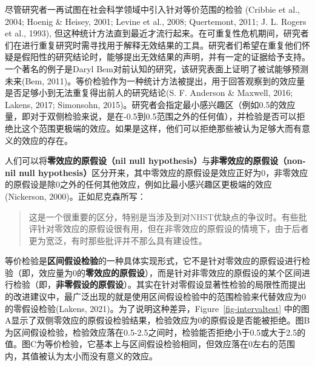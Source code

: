 \documentclass[
  letterpaper,
  DIV=11,
  numbers=noendperiod]{scrreprt}
\begin{document}
尽管研究者一再试图在社会科学领域中引入针对等价范围的检验 (Cribbie et
al., 2004; Hoenig \& Heisey, 2001; Levine et al., 2008; Quertemont,
2011; J. L. Rogers et al., 1993),
但这种统计方法直到最近才流行起来。在可重复性危机期间，研究者们在进行重复研究时需寻找用于解释无效结果的工具。研究者们希望在重复他们怀疑是假阳性的研究结论时，能够提出无效结果的声明，并有一定的证据给予支持。一个著名的例子是Daryl
Bem对前认知的研究，该研究表面上证明了被试能够预测未来(Bem,
2011)。等价检验作为一种统计方法被提出，用于回答观察到的效应量是否足够小到无法重复得出前人的研究结论(S.
F. Anderson \& Maxwell, 2016; Lakens, 2017; Simonsohn,
2015)。研究者会指定最小感兴趣区（例如0.5的效应量，即对于双侧检验来说，是在-0.5到0.5范围之外的任何值），并检验是否可以拒绝比这个范围更极端的效应。如果是这样，他们可以拒绝那些被认为足够大而有意义的效应的存在。

人们可以将\textbf{零效应的原假设（nil null
hypothesis）}与\textbf{非零效应的原假设（non-nil null
hypothesis）}区分开来，其中零效应的原假设是效应正好为0，非零效应的原假设是除0之外的任何其他效应，例如比最小感兴趣区更极端的效应(Nickerson,
2000)。正如尼克森所写：

\begin{quote}
这是一个很重要的区分，特别是当涉及到对NHST优缺点的争议时。有些批评针对零效应的原假设很有用，但在非零效应的原假设的情境下，由于后者更为宽泛，有时那些批评并不那么具有建设性。
\end{quote}

等价检验是\textbf{区间假设检验}的一种具体实现形式，它不是针对零效应的原假设进行检验（即，效应量为0的\textbf{零效应的原假设}），而是针对非零效应的原假设的某个区间进行检验（即，\textbf{非零假设的原假设}）。其实在针对零假设显著性检验的局限性而提出的改进建议中，最广泛出现的就是使用区间假设检验中的范围检验来代替效应为0的零假设检验(Lakens,
2021)。为了说明这种差异，Figure~\ref{fig-intervaltest}
中的图A显示了双侧零效应的原假设检验结果，检验效应为0的原假设是否能被拒绝。图B为区间假设检验，检验效应落在0.5-2.5之间时，检验能否拒绝小于0.5或大于2.5的值。图C为等价检验，它基本上与区间假设检验相同，但效应落在0左右的范围内，其值被认为太小而没有意义的效应。
\end{document}
